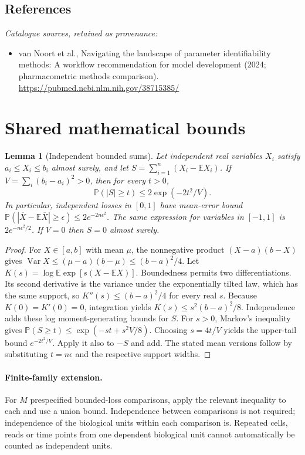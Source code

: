 \documentclass[11pt]{article}
\newcommand{\E}{\mathbb E}
\newcommand{\Prob}{\mathbb P}
\DeclareMathOperator{\Var}{Var}
\providecommand{\E}{\mathbb E}
\providecommand{\Prob}{\mathbb P}
\providecommand{\Var}{\operatorname{Var}}
\newtheorem{sharedlemma}{Lemma}[section]
\begin{document}
\subsection{References}
\noindent\emph{Catalogue sources, retained as provenance:}
\begin{itemize}
\item van Noort et al., Navigating the landscape of parameter identifiability methods: A workflow recommendation for model development (2024; pharmacometric methods comparison). \url{https://pubmed.ncbi.nlm.nih.gov/38715385/}
\end{itemize}
\clearpage


\appendix
\section{Shared mathematical bounds}\label{app:bounds}
\begin{sharedlemma}[Independent bounded sums]\label{lem:bounded}
Let independent real variables $X_i$ satisfy $a_i\leq X_i\leq b_i$ almost surely,
and let $S=\sum_{i=1}^n(X_i-\E X_i)$. If
$V=\sum_i(b_i-a_i)^2>0$, then for every $t>0$,
\[
 \Prob(|S|\geq t)\leq 2\exp(-2t^2/V).
\]
In particular, independent losses in $[0,1]$ have mean-error bound
$\Prob(|\overline X-\E\overline X|\geq\epsilon)
\leq2e^{-2n\epsilon^2}$. The same expression for variables in $[-1,1]$
is $2e^{-n\epsilon^2/2}$. If $V=0$ then $S=0$ almost surely.
\end{sharedlemma}
\begin{proof}
For $X\in[a,b]$ with mean $\mu$, the nonnegative product
$(X-a)(b-X)$ gives
$\Var X\leq(\mu-a)(b-\mu)\leq(b-a)^2/4$.
Let $K(s)=\log\E\exp[s(X-\E X)]$.
Boundedness permits two differentiations. Its second derivative is the variance
under the exponentially tilted law, which has the same support, so
$K''(s)\leq(b-a)^2/4$ for every real $s$.
Because $K(0)=K'(0)=0$, integration yields
$K(s)\leq s^2(b-a)^2/8$.
Independence adds these log moment-generating bounds for $S$.
For $s>0$, Markov's inequality gives
$\Prob(S\geq t)\leq\exp(-st+s^2V/8)$.
Choosing $s=4t/V$ yields the upper-tail bound $e^{-2t^2/V}$.
Apply it also to $-S$ and add. The stated mean versions follow by substituting
$t=n\epsilon$ and the respective support widths.
\end{proof}

\paragraph{Finite-family extension.}
For $M$ prespecified bounded-loss comparisons, apply the relevant inequality to
each and use a union bound. Independence between comparisons is not required;
independence of the biological units within each comparison is. Repeated cells,
reads or time points from one dependent biological unit cannot automatically be
counted as independent units.
\end{document}
